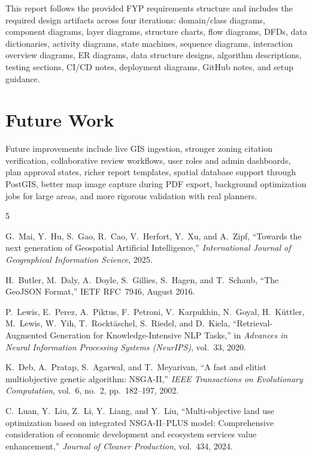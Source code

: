 \documentclass[12pt,a4paper,oneside]{report}
\begin{document}
This report follows the provided FYP requirements structure and includes the required design artifacts across four iterations: domain/class diagrams, component diagrams, layer diagrams, structure charts, flow diagrams, DFDs, data dictionaries, activity diagrams, state machines, sequence diagrams, interaction overview diagrams, ER diagrams, data structure designs, algorithm descriptions, testing sections, CI/CD notes, deployment diagrams, GitHub notes, and setup guidance.

\section{Future Work}
Future improvements include live GIS ingestion, stronger zoning citation verification, collaborative review workflows, user roles and admin dashboards, plan approval states, richer report templates, spatial database support through PostGIS, better map image capture during PDF export, background optimization jobs for large areas, and more rigorous validation with real planners.

\begin{thebibliography}{5}

G.~Mai, Y.~Hu, S.~Gao, R.~Cao, V.~Herfort, Y.~Xu, and A.~Zipf,
``Towards the next generation of Geospatial Artificial Intelligence,''
\textit{International Journal of Geographical Information Science}, 2025.

H.~Butler, M.~Daly, A.~Doyle, S.~Gillies, S.~Hagen, and T.~Schaub,
``The GeoJSON Format,''
IETF RFC~7946, August 2016.

P.~Lewis, E.~Perez, A.~Piktus, F.~Petroni, V.~Karpukhin, N.~Goyal, H.~K\"{u}ttler, M.~Lewis, W.~Yih, T.~Rockt\"{a}schel, S.~Riedel, and D.~Kiela,
``Retrieval-Augmented Generation for Knowledge-Intensive NLP Tasks,''
in \textit{Advances in Neural Information Processing Systems (NeurIPS)}, vol.~33, 2020.

K.~Deb, A.~Pratap, S.~Agarwal, and T.~Meyarivan,
``A fast and elitist multiobjective genetic algorithm: NSGA-II,''
\textit{IEEE Transactions on Evolutionary Computation}, vol.~6, no.~2, pp.~182--197, 2002.

C.~Luan, Y.~Liu, Z.~Li, Y.~Liang, and Y.~Liu,
``Multi-objective land use optimization based on integrated NSGA-II--PLUS model: Comprehensive consideration of economic development and ecosystem services value enhancement,''
\textit{Journal of Cleaner Production}, vol.~434, 2024.

\end{thebibliography}
\end{document}
